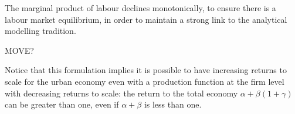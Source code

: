 The marginal product of labour declines monotonically, to ensure there is a labour market equilibrium, in order to maintain a strong link to the analytical modelling tradition.



MOVE?

 Notice that this formulation implies it is possible to have increasing returns to scale for the urban economy even with a production function at the firm level with decreasing returns to scale: the return to the total economy $\alpha + \beta(1 + \gamma)$ can be greater than one, even if $\alpha +\beta$ is less than one. %
 
